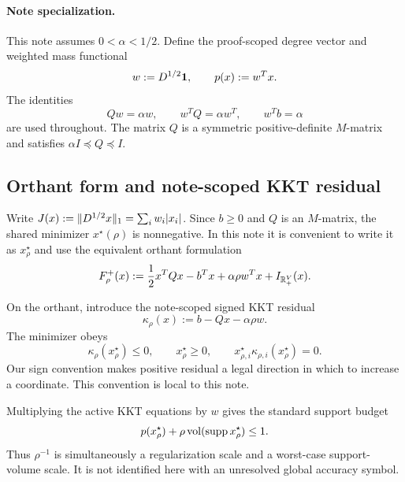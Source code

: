 

\paragraph{Note specialization.}
This note assumes \(0<\alpha<1/2\). Define the proof-scoped degree vector and
weighted mass functional
\[
  w:=D^{1/2}\mathbf{1},
  \qquad
  p(x):=w^Tx.
\]
The identities
\begin{equation}
  Qw=\alpha w,
  \qquad
  w^TQ=\alpha w^T,
  \qquad
  w^Tb=\alpha
  \label{eq:weighted-identities}
\end{equation}
are used throughout.  The matrix $Q$ is a symmetric positive-definite
$M$-matrix and satisfies $\alpha I\preceq Q\preceq I$.

\subsection{Orthant form and note-scoped KKT residual}

Write \(J(x):=\lVert D^{1/2}x\rVert_1=\sum_i w_i|x_i|\). Since \(b\ge0\)
and \(Q\) is an \(M\)-matrix, the shared minimizer \(x^\star(\rho)\) is
nonnegative. In this note it is convenient to write it as \(x_\rho^\star\)
and use the equivalent orthant formulation
\begin{equation}
 F_\rho^+(x)
 :=\frac12x^TQx-b^Tx+\alpha\rho w^Tx+I_{\mathbb{R}_+^V}(x).
 \label{eq:orthant-rppr}
\end{equation}

On the orthant, introduce the note-scoped signed KKT residual
\begin{equation}
  \kappa_\rho(x):=b-Qx-\alpha\rho w.
  \label{eq:kkt-residual}
\end{equation}
The minimizer obeys
\begin{equation}
  \kappa_\rho(x_\rho^\star)\le0,
  \qquad
  x_\rho^\star\ge0,
  \qquad
  x_{\rho,i}^\star \kappa_{\rho,i}(x_\rho^\star)=0.
  \label{eq:kkt}
\end{equation}
Our sign convention makes positive residual a legal direction in which to
increase a coordinate.  This convention is local to this note.

Multiplying the active KKT equations by $w$ gives the standard support budget
\begin{equation}
  p(x_\rho^\star)+\rho\operatorname{vol}(\operatorname{supp} x_\rho^\star)\le1.
  \label{eq:rppr-support-budget}
\end{equation}
Thus $\rho^{-1}$ is simultaneously a regularization scale and a worst-case
support-volume scale. It is not identified here with an unresolved global
accuracy symbol.

